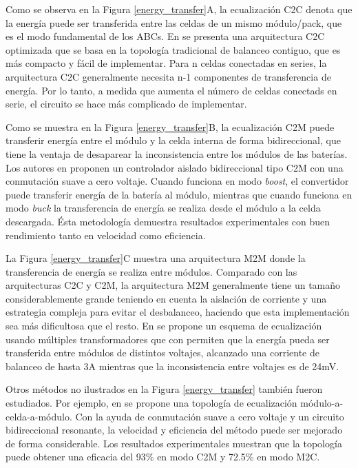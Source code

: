\documentclass[10pt,a4paper]{article}
\begin{document}
Como se observa en la Figura \ref{energy_transfer}A, la ecualizaci\'on
\acrshort{C2C} denota que la energ\'ia puede ser transferida entre las celdas de
un mismo m\'odulo/pack, que es el modo fundamental de los \acrshort{ABC}s. En
\cite{phung_bal} se presenta una arquitectura \acrshort{C2C} optimizada que se 
basa en la topolog\'ia tradicional de balanceo contiguo, que es m\'as compacto y 
f\'acil de implementar. Para n celdas conectadas en series, la arquitectura 
\acrshort{C2C} generalmente necesita n-1 componentes de transferencia de 
energ\'ia. Por lo tanto, a medida que aumenta el n\'umero de celdas conectads en
serie, el circuito se hace m\'as complicado de implementar.

Como se muestra en la Figura \ref{energy_transfer}B, la ecualizaci\'on
\acrshort{C2M} puede transferir energ\'ia entre el m\'odulo  y la celda interna
de forma bidireccional, que tiene la ventaja de desaparear la inconsistencia
entre los m\'odulos de las bater\'ias. Los autores en \cite{lu_et_al_bal} 
proponen un controlador aislado bidireccional tipo \acrshort{C2M} con una 
conmutaci\'on suave a cero voltaje. Cuando funciona en modo \emph{boost}, el 
convertidor puede transferir energ\'ia de la bater\'ia al m\'odulo, mientras que 
cuando funciona en modo \emph{buck} la transferencia de energ\'ia se realiza 
desde el m\'odulo a la celda descargada. \'Esta metodolog\'ia demuestra 
resultados experimentales con buen rendimiento tanto en velocidad como 
eficiencia.

La Figura \ref{energy_transfer}C muestra una arquitectura \acrshort{M2M}
donde la transferencia de energ\'ia se realiza entre m\'odulos. Comparado con
las arquitecturas \acrshort{C2C} y \acrshort{C2M}, la arquitectura 
\acrshort{M2M} generalmente tiene un tamaño considerablemente grande teniendo en 
cuenta la aislaci\'on de corriente y una estrategia compleja para evitar el 
desbalanceo, haciendo que esta implementaci\'on sea m\'as dificultosa que el 
resto. En \cite{ji_et_al_bal_mod} se propone un esquema de ecualizaci\'on usando 
m\'ultiples transformadores que con permiten que la energ\'ia pueda ser 
transferida entre m\'odulos de distintos voltajes, alcanzado una corriente de 
balanceo de hasta 3A mientras que la inconsistencia entre voltajes es de 24mV.

Otros m\'etodos no ilustrados en la Figura \ref{energy_transfer} tambi\'en
fueron estudiados. Por ejemplo, en \cite{li_et_al_bal} se propone una 
topolog\'ia de ecualizaci\'on m\'odulo-a-celda-a-m\'odulo. Con la ayuda de 
conmutaci\'on suave a cero voltaje y un circuito bidireccional resonante, la 
velocidad y eficiencia del m\'etodo puede ser mejorado de forma considerable. 
Los resultados experimentales muestran que la topolog\'ia puede obtener una 
eficacia del 93\% en modo \acrshort{C2M} y 72.5\% en modo \acrshort{M2C}.
\end{document}

